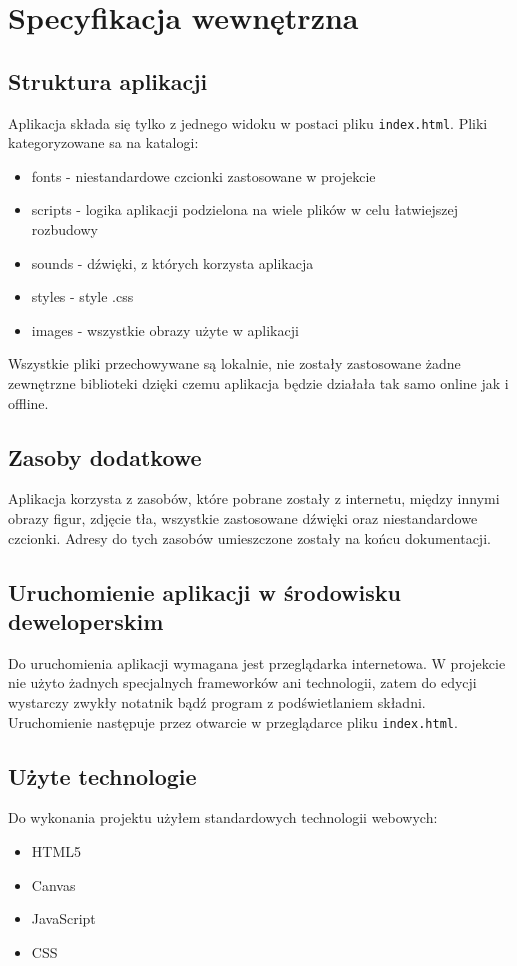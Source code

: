 \documentclass[a4paper,11pt,titlepage]{article}
\begin{document}
\section{Specyfikacja wewnętrzna}
\subsection{Struktura aplikacji}
Aplikacja składa się tylko z jednego widoku w postaci pliku \verb|index.html|. Pliki kategoryzowane sa na katalogi:
\begin{itemize}
	\item fonts - niestandardowe czcionki zastosowane w projekcie
	\item scripts - logika aplikacji podzielona na wiele plików w celu łatwiejszej rozbudowy
	\item sounds - dźwięki, z których korzysta aplikacja
	\item styles - style .css
	\item images - wszystkie obrazy użyte w aplikacji
\end{itemize}

Wszystkie pliki przechowywane są lokalnie, nie zostały zastosowane żadne zewnętrzne biblioteki dzięki czemu aplikacja będzie działała tak samo online jak i offline.

\subsection{Zasoby dodatkowe}
Aplikacja korzysta z zasobów, które pobrane zostały z internetu, między innymi obrazy figur, zdjęcie tła, wszystkie zastosowane dźwięki oraz niestandardowe czcionki. Adresy do tych zasobów umieszczone zostały na końcu dokumentacji.

\subsection{Uruchomienie aplikacji w środowisku deweloperskim}
Do uruchomienia aplikacji wymagana jest przeglądarka internetowa. W projekcie nie użyto żadnych specjalnych frameworków ani technologii, zatem do edycji wystarczy zwykły notatnik bądź program z podświetlaniem składni. Uruchomienie następuje przez otwarcie w przeglądarce pliku \verb|index.html|.

\subsection{Użyte technologie}
Do wykonania projektu użyłem standardowych technologii webowych:
\begin{itemize}
	\item HTML5
	\item Canvas
	\item JavaScript
	\item CSS
\end{itemize}
\end{document}
